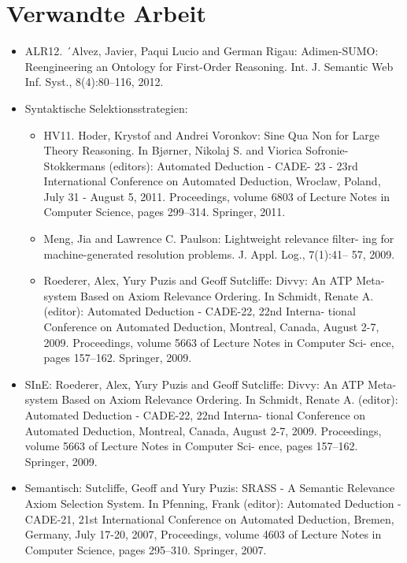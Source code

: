 \documentclass[german,version-2020-11]{uzl-thesis}
\begin{document}
\chapter{Verwandte Arbeit}
\begin{itemize}
  \item ALR12. ´Alvez, Javier, Paqui Lucio and German Rigau: Adimen-SUMO:
  Reengineering an Ontology for First-Order Reasoning. Int. J. Semantic
  Web Inf. Syst., 8(4):80–116, 2012.
  \item Syntaktische Selektionsstrategien:
  \begin{itemize}
    \item HV11. Hoder, Krystof and Andrei Voronkov: Sine Qua Non for
    Large Theory Reasoning. In Bjørner, Nikolaj S. and Viorica
    Sofronie-Stokkermans (editors): Automated Deduction - CADE-
    23 - 23rd International Conference on Automated Deduction, Wroclaw,
    Poland, July 31 - August 5, 2011. Proceedings, volume 6803 of Lecture
    Notes in Computer Science, pages 299–314. Springer, 2011.
    \item Meng, Jia and Lawrence C. Paulson: Lightweight relevance filter-
    ing for machine-generated resolution problems. J. Appl. Log., 7(1):41–
    57, 2009.
    \item Roederer, Alex, Yury Puzis and Geoff Sutcliffe: Divvy: An
    ATP Meta-system Based on Axiom Relevance Ordering. In Schmidt,
    Renate A. (editor): Automated Deduction - CADE-22, 22nd Interna-
    tional Conference on Automated Deduction, Montreal, Canada, August
    2-7, 2009. Proceedings, volume 5663 of Lecture Notes in Computer Sci-
    ence, pages 157–162. Springer, 2009.
  \end{itemize}
  \item SInE: Roederer, Alex, Yury Puzis and Geoff Sutcliffe: Divvy: An
  ATP Meta-system Based on Axiom Relevance Ordering. In Schmidt,
  Renate A. (editor): Automated Deduction - CADE-22, 22nd Interna-
  tional Conference on Automated Deduction, Montreal, Canada, August
  2-7, 2009. Proceedings, volume 5663 of Lecture Notes in Computer Sci-
  ence, pages 157–162. Springer, 2009.
  \item Semantisch: Sutcliffe, Geoff and Yury Puzis: SRASS - A Semantic Relevance
  Axiom Selection System. In Pfenning, Frank (editor): Automated
  Deduction - CADE-21, 21st International Conference on Automated
  Deduction, Bremen, Germany, July 17-20, 2007, Proceedings, volume
  4603 of Lecture Notes in Computer Science, pages 295–310. Springer,
  2007.
\end{itemize}
%
\end{document}
